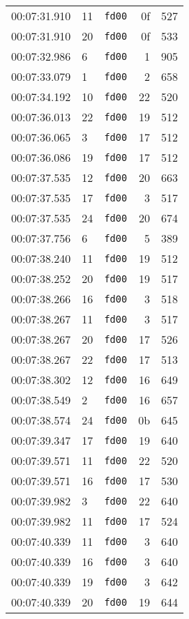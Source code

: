 \documentclass{article}
\begin{document}
\begin{longtable}{lllrr}
00:07:31.910 & 11 & \texttt{fd00} & 0f & 527 \\
00:07:31.910 & 20 & \texttt{fd00} & 0f & 533 \\
00:07:32.986 & 6 & \texttt{fd00} & 1 & 905 \\
00:07:33.079 & 1 & \texttt{fd00} & 2 & 658 \\
00:07:34.192 & 10 & \texttt{fd00} & 22 & 520 \\
00:07:36.013 & 22 & \texttt{fd00} & 19 & 512 \\
00:07:36.065 & 3 & \texttt{fd00} & 17 & 512 \\
00:07:36.086 & 19 & \texttt{fd00} & 17 & 512 \\
00:07:37.535 & 12 & \texttt{fd00} & 20 & 663 \\
00:07:37.535 & 17 & \texttt{fd00} & 3 & 517 \\
00:07:37.535 & 24 & \texttt{fd00} & 20 & 674 \\
00:07:37.756 & 6 & \texttt{fd00} & 5 & 389 \\
00:07:38.240 & 11 & \texttt{fd00} & 19 & 512 \\
00:07:38.252 & 20 & \texttt{fd00} & 19 & 517 \\
00:07:38.266 & 16 & \texttt{fd00} & 3 & 518 \\
00:07:38.267 & 11 & \texttt{fd00} & 3 & 517 \\
00:07:38.267 & 20 & \texttt{fd00} & 17 & 526 \\
00:07:38.267 & 22 & \texttt{fd00} & 17 & 513 \\
00:07:38.302 & 12 & \texttt{fd00} & 16 & 649 \\
00:07:38.549 & 2 & \texttt{fd00} & 16 & 657 \\
00:07:38.574 & 24 & \texttt{fd00} & 0b & 645 \\
00:07:39.347 & 17 & \texttt{fd00} & 19 & 640 \\
00:07:39.571 & 11 & \texttt{fd00} & 22 & 520 \\
00:07:39.571 & 16 & \texttt{fd00} & 17 & 530 \\
00:07:39.982 & 3 & \texttt{fd00} & 22 & 640 \\
00:07:39.982 & 11 & \texttt{fd00} & 17 & 524 \\
00:07:40.339 & 11 & \texttt{fd00} & 3 & 640 \\
00:07:40.339 & 16 & \texttt{fd00} & 3 & 640 \\
00:07:40.339 & 19 & \texttt{fd00} & 3 & 642 \\
00:07:40.339 & 20 & \texttt{fd00} & 19 & 644 \\

\end{longtable}
\end{document}
